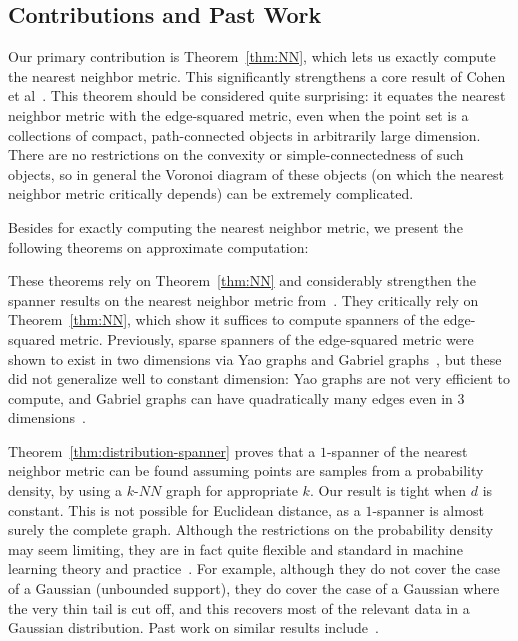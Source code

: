 \subsection{Contributions and Past Work}
Our primary contribution is Theorem~\ref{thm:NN}, which lets us exactly
compute the nearest neighbor metric. This significantly strengthens a core
result of Cohen et al~\cite{cohen15approximating}. This theorem should be considered
quite surprising: it equates the nearest neighbor metric with the
edge-squared metric, even when the point set is a collections of compact,
path-connected objects in arbitrarily large dimension. There are no
restrictions on the convexity or simple-connectedness of such objects, so
in general the Voronoi diagram of these objects (on which the nearest
neighbor metric critically depends) can be extremely complicated.

 Besides for exactly computing the nearest neighbor metric, we present the
following theorems on approximate computation:

 
These theorems rely on Theorem~\ref{thm:NN} and considerably strengthen the
spanner results on the nearest neighbor metric
from~\cite{cohen15approximating}. They critically rely on
Theorem~\ref{thm:NN}, which show it suffices to compute spanners of the
edge-squared metric.
Previously, sparse spanners of the edge-squared metric were shown to exist in two
dimensions via Yao graphs and Gabriel graphs~\cite{LiWan2001}, but these
did not generalize well to constant dimension: Yao
graphs are not very efficient to compute, and Gabriel graphs can have
quadratically many edges even in $3$ dimensions~\cite{chazelle94selecting}.

Theorem~\ref{thm:distribution-spanner} proves that a $1$-spanner of
the nearest neighbor metric can be found assuming points are samples from a
probability density, by using a $k$-$NN$ graph for
appropriate $k$. Our result is tight when $d$ is constant. This
is not possible for Euclidean distance, as a $1$-spanner is almost
surely the complete graph. Although the restrictions on the probability
density may seem limiting,
they are in fact quite flexible and standard in
machine learning theory and practice~\cite{hwang2016, alamgir12shortest}. For example, although they do not cover the case
of a Gaussian (unbounded support), they do cover the case of a Gaussian
where the very thin tail is cut off, and this recovers most of the relevant
data in a Gaussian distribution. Past work on similar results
include~\cite{Balister05, Gonzales2003}.

